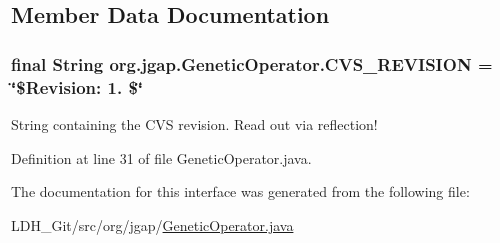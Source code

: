 \subsection{Member Data Documentation}
\hypertarget{interfaceorg_1_1jgap_1_1_genetic_operator_ad0ddbf3fa1dfd7bd8639eba1d9e35267}{
\subsubsection[{C\-V\-S\-\_\-\-R\-E\-V\-I\-S\-I\-O\-N}]{\setlength{\rightskip}{0pt plus 5cm}final String org.\-jgap.\-Genetic\-Operator.\-C\-V\-S\-\_\-\-R\-E\-V\-I\-S\-I\-O\-N = \char`\"{}\$Revision\-: 1. \$\char`\"{}\hspace{0.3cm}{\ttfamily [static]}}}\label{interfaceorg_1_1jgap_1_1_genetic_operator_ad0ddbf3fa1dfd7bd8639eba1d9e35267}
String containing the C\-V\-S revision. Read out via reflection! 

Definition at line 31 of file Genetic\-Operator.\-java.



The documentation for this interface was generated from the following file\-:\begin{DoxyCompactItemize}
\item 
L\-D\-H\-\_\-\-Git/src/org/jgap/\hyperlink{_genetic_operator_8java}{Genetic\-Operator.\-java}\end{DoxyCompactItemize}
